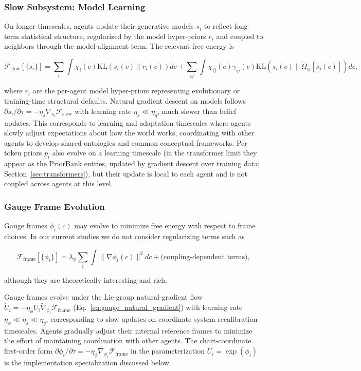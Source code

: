\documentclass[11pt]{article}
\begin{document}
\subsubsection{Slow Subsystem: Model Learning}

On longer timescales, agents update their generative models $s_i$ to reflect long-term statistical structure, regularized by the model hyper-priors $r_i$ and coupled to neighbors through the model-alignment term. The relevant free energy is

\begin{equation}
\mathcal{F}_{\text{slow}}[\{s_i\}] = \sum_i \int \chi_i(c)  \mathrm{KL}(s_i(c) \| r_i(c))  dc
+ \sum_{ij} \int \chi_{ij}(c)  \gamma_{ij}(c)  \mathrm{KL}(s_i(c) \| \tilde{\Omega}_{ij}[s_j(c)])  dc,
\end{equation}

where $r_i$ are the per-agent model hyper-priors representing evolutionary or training-time structural defaults. Natural gradient descent on models follows $\partial s_i/\partial \tau = -\eta_s  \tilde{\nabla}_{s_i} \mathcal{F}_{\text{slow}}$ with learning rate $\eta_s \ll \eta_q$, much slower than belief updates. This corresponds to learning and adaptation timescales where agents slowly adjust expectations about how the world works, coordinating with other agents to develop shared ontologies and common conceptual frameworks. Per-token priors $p_i$ also evolve on a learning timescale (in the transformer limit they appear as the PriorBank entries, updated by gradient descent over training data; Section~\ref{sec:transformers}), but their update is local to each agent and is not coupled across agents at this level.

\subsubsection{Gauge Frame Evolution}

Gauge frames $\phi_i(c)$ may evolve to minimize free energy with respect to frame choices.  In our current studies we do not consider regularizing terms such as

\begin{equation}
\mathcal{F}_{\text{frame}}[\{\phi_i\}] = \lambda_\phi \sum_i \int \|\nabla \phi_i(c)\|^2  dc + \text{(coupling-dependent terms)},
\end{equation}

although they are theoretically interesting and rich.

Gauge frames evolve under the Lie-group natural-gradient flow $\dot U_i = -\eta_\phi U_i \tilde{\nabla}_{\phi_i}\mathcal{F}_{\text{frame}}$ (Eq.~\ref{eq:gauge_natural_gradient}) with learning rate $\eta_\phi \ll \eta_s \ll \eta_q$, corresponding to slow updates on coordinate system recalibration timescales. Agents gradually adjust their internal reference frames to minimize the effort of maintaining coordination with other agents. The chart-coordinate first-order form $\partial\phi_i/\partial\tau = -\eta_\phi \tilde{\nabla}_{\phi_i}\mathcal{F}_{\text{frame}}$ in the parameterization $U_i = \exp(\phi_i)$ is the implementation specialization discussed below.
\end{document}
